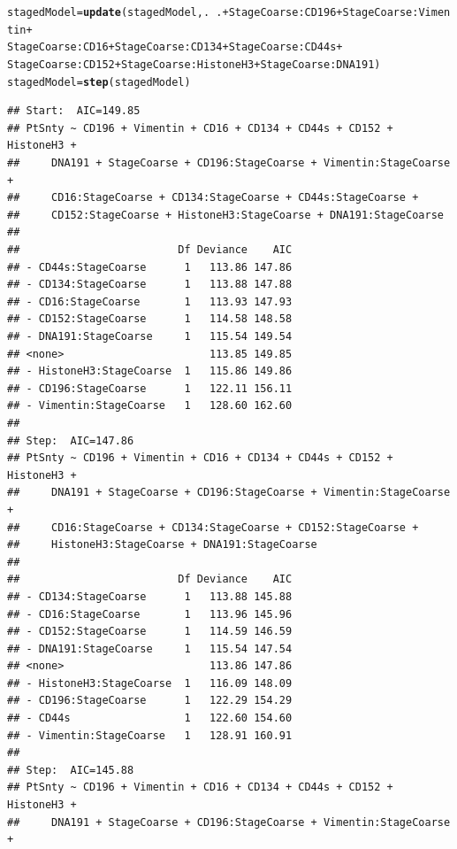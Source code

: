 \documentclass[a4paper]{article}\usepackage[]{graphicx}\usepackage[]{color}
\makeatletter
\newcommand{\hlopt}[1]{\textcolor[rgb]{0,0,0}{#1}}%
\newcommand{\hlstd}[1]{\textcolor[rgb]{0.345,0.345,0.345}{#1}}%
\newcommand{\hlkwb}[1]{\textcolor[rgb]{0.69,0.353,0.396}{#1}}%
\newcommand{\hlkwd}[1]{\textcolor[rgb]{0.737,0.353,0.396}{\textbf{#1}}}%
\newenvironment{kframe}{%
 \def\at@end@of@kframe{}%
 \ifinner\ifhmode%
  \def\at@end@of@kframe{\end{minipage}}%
  \begin{minipage}{\columnwidth}%
 \fi\fi%
 \def\FrameCommand##1{\hskip\@totalleftmargin \hskip-\fboxsep
 \colorbox{shadecolor}{##1}\hskip-\fboxsep
     \hskip-\linewidth \hskip-\@totalleftmargin \hskip\columnwidth}%
 \MakeFramed {\advance\hsize-\width
   \@totalleftmargin\z@ \linewidth\hsize
   \@setminipage}}%
 {\par\unskip\endMakeFramed%
 \at@end@of@kframe}
\newenvironment{knitrout}{}{} %
\makeatother
\begin{document}
\begin{knitrout}
\color{fgcolor}\begin{kframe}
\begin{alltt}
\hlstd{stagedModel} \hlkwb{=} \hlkwd{update}\hlstd{(stagedModel,.}\hlopt{~}\hlstd{.}\hlopt{+}\hlstd{StageCoarse}\hlopt{:}\hlstd{CD196}\hlopt{+}\hlstd{StageCoarse}\hlopt{:}\hlstd{Vimentin}\hlopt{+}
                       \hlstd{StageCoarse}\hlopt{:}\hlstd{CD16}\hlopt{+}\hlstd{StageCoarse}\hlopt{:}\hlstd{CD134}\hlopt{+}\hlstd{StageCoarse}\hlopt{:}\hlstd{CD44s}\hlopt{+}
                       \hlstd{StageCoarse}\hlopt{:}\hlstd{CD152}\hlopt{+}\hlstd{StageCoarse}\hlopt{:}\hlstd{HistoneH3}\hlopt{+}\hlstd{StageCoarse}\hlopt{:}\hlstd{DNA191)}
\hlstd{stagedModel}\hlkwb{=}\hlkwd{step}\hlstd{(stagedModel)}
\end{alltt}
\begin{verbatim}
## Start:  AIC=149.85
## PtSnty ~ CD196 + Vimentin + CD16 + CD134 + CD44s + CD152 + HistoneH3 + 
##     DNA191 + StageCoarse + CD196:StageCoarse + Vimentin:StageCoarse + 
##     CD16:StageCoarse + CD134:StageCoarse + CD44s:StageCoarse + 
##     CD152:StageCoarse + HistoneH3:StageCoarse + DNA191:StageCoarse
## 
##                         Df Deviance    AIC
## - CD44s:StageCoarse      1   113.86 147.86
## - CD134:StageCoarse      1   113.88 147.88
## - CD16:StageCoarse       1   113.93 147.93
## - CD152:StageCoarse      1   114.58 148.58
## - DNA191:StageCoarse     1   115.54 149.54
## <none>                       113.85 149.85
## - HistoneH3:StageCoarse  1   115.86 149.86
## - CD196:StageCoarse      1   122.11 156.11
## - Vimentin:StageCoarse   1   128.60 162.60
## 
## Step:  AIC=147.86
## PtSnty ~ CD196 + Vimentin + CD16 + CD134 + CD44s + CD152 + HistoneH3 + 
##     DNA191 + StageCoarse + CD196:StageCoarse + Vimentin:StageCoarse + 
##     CD16:StageCoarse + CD134:StageCoarse + CD152:StageCoarse + 
##     HistoneH3:StageCoarse + DNA191:StageCoarse
## 
##                         Df Deviance    AIC
## - CD134:StageCoarse      1   113.88 145.88
## - CD16:StageCoarse       1   113.96 145.96
## - CD152:StageCoarse      1   114.59 146.59
## - DNA191:StageCoarse     1   115.54 147.54
## <none>                       113.86 147.86
## - HistoneH3:StageCoarse  1   116.09 148.09
## - CD196:StageCoarse      1   122.29 154.29
## - CD44s                  1   122.60 154.60
## - Vimentin:StageCoarse   1   128.91 160.91
## 
## Step:  AIC=145.88
## PtSnty ~ CD196 + Vimentin + CD16 + CD134 + CD44s + CD152 + HistoneH3 + 
##     DNA191 + StageCoarse + CD196:StageCoarse + Vimentin:StageCoarse + 

\end{verbatim}
\end{kframe}
\end{knitrout}
\end{document}
